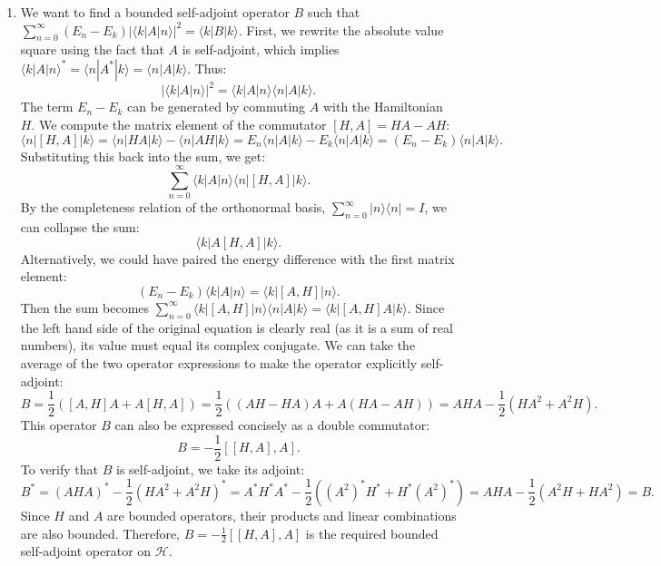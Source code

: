 \documentclass{article}
\begin{document}
\begin{enumerate}[label=\fbox{\arabic*}]
  \item %
        We want to find a bounded self-adjoint operator $B$ such that $\sum_{n=0}^\infty (E_n - E_k) |\langle k | A | n \rangle|^2 = \langle k | B | k \rangle$.
        First, we rewrite the absolute value square using the fact that $A$ is self-adjoint, which implies $\langle k | A | n \rangle^* = \langle n | A^* | k \rangle = \langle n | A | k \rangle$. Thus:
        \[
          |\langle k | A | n \rangle|^2 = \langle k | A | n \rangle \langle n | A | k \rangle.
        \]
        The term $E_n - E_k$ can be generated by commuting $A$ with the Hamiltonian $H$. 
        We compute the matrix element of the commutator $[H, A] = HA - AH$:
        \[
          \langle n | [H, A] | k \rangle = \langle n | H A | k \rangle - \langle n | A H | k \rangle = E_n \langle n | A | k \rangle - E_k \langle n | A | k \rangle = (E_n - E_k) \langle n | A | k \rangle.
        \]
        Substituting this back into the sum, we get:
        \[
          \sum_{n=0}^\infty \langle k | A | n \rangle \langle n | [H, A] | k \rangle.
        \]
        By the completeness relation of the orthonormal basis, $\sum_{n=0}^\infty |n\rangle \langle n| = I$, we can collapse the sum:
        \[
          \langle k | A [H, A] | k \rangle.
        \]
        Alternatively, we could have paired the energy difference with the first matrix element:
        \[
          (E_n - E_k) \langle k | A | n \rangle = \langle k | [A, H] | n \rangle.
        \]
        Then the sum becomes $\sum_{n=0}^\infty \langle k | [A, H] | n \rangle \langle n | A | k \rangle = \langle k | [A, H] A | k \rangle$.
        Since the left hand side of the original equation is clearly real (as it is a sum of real numbers), its value must equal its complex conjugate. We can take the average of the two operator expressions to make the operator explicitly self-adjoint:
        \[
          B = \frac{1}{2} \left( [A, H] A + A [H, A] \right) = \frac{1}{2} \left( (AH - HA)A + A(HA - AH) \right) = AHA - \frac{1}{2} (HA^2 + A^2H).
        \]
        This operator $B$ can also be expressed concisely as a double commutator:
        \[
          B = -\frac{1}{2} [[H, A], A].
        \]
        To verify that $B$ is self-adjoint, we take its adjoint:
        \[
          B^* = (AHA)^* - \frac{1}{2} (HA^2 + A^2H)^* = A^*H^*A^* - \frac{1}{2} ((A^2)^*H^* + H^*(A^2)^*) = AHA - \frac{1}{2} (A^2H + HA^2) = B.
        \]
        Since $H$ and $A$ are bounded operators, their products and linear combinations are also bounded. Therefore, $B = -\frac{1}{2} [[H, A], A]$ is the required bounded self-adjoint operator on $\mathcal{H}$.
\end{enumerate}
\end{document}
